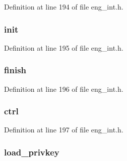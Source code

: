 Definition at line 194 of file eng\+\_\+int.\+h.

\subsubsection[{\texorpdfstring{init}{init}}]{ init}\hypertarget{structengine__st_a2e21d932f89084ff414a1230be687557}{}\label{structengine__st_a2e21d932f89084ff414a1230be687557}


Definition at line 195 of file eng\+\_\+int.\+h.

\subsubsection[{\texorpdfstring{finish}{finish}}]{ finish}\hypertarget{structengine__st_a379a01f9bb776458c4811bfc1ffe643f}{}\label{structengine__st_a379a01f9bb776458c4811bfc1ffe643f}


Definition at line 196 of file eng\+\_\+int.\+h.

\subsubsection[{\texorpdfstring{ctrl}{ctrl}}]{ ctrl}\hypertarget{structengine__st_aaa05504716b9c1108e61de4c891d76df}{}\label{structengine__st_aaa05504716b9c1108e61de4c891d76df}


Definition at line 197 of file eng\+\_\+int.\+h.

\subsubsection[{\texorpdfstring{load\+\_\+privkey}{load_privkey}}]{ load\+\_\+privkey}\hypertarget{structengine__st_af7f789e1432a4004768a1804198b0d8c}{}\label{structengine__st_af7f789e1432a4004768a1804198b0d8c}


